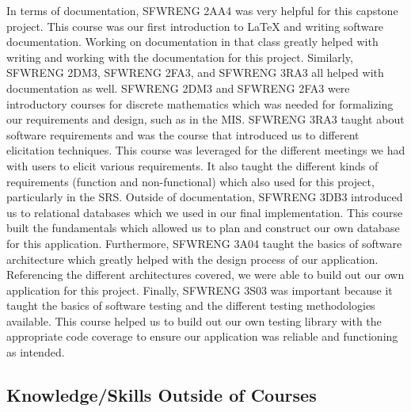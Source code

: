 \documentclass{article}
\begin{document}
In terms of documentation, SFWRENG 2AA4 was very helpful for this capstone project. This course was our first
introduction to \LaTeX{} and writing software documentation. Working on documentation in that class greatly helped
with writing and working with the documentation for this project. Similarly, SFWRENG 2DM3, SFWRENG 2FA3, and SFWRENG 3RA3
all helped with documentation as well. SFWRENG 2DM3 and SFWRENG 2FA3 were introductory courses for discrete mathematics
which was needed for formalizing our requirements and design, such as in the MIS. SFWRENG 3RA3 taught about software requirements and was the course
that introduced us to different elicitation techniques. This course was leveraged for the different meetings we had with users to elicit
various requirements. It also taught the different kinds of requirements (function and non-functional) which also used for this project, particularly
in the SRS. Outside of documentation, SFWRENG 3DB3 introduced us to relational databases which we used in our final
implementation. This course built the fundamentals which allowed us to plan and construct our own database for this application.
Furthermore, SFWRENG 3A04 taught the basics of software architecture which greatly helped with the design process of our
application. Referencing the different architectures covered, we were able to build out our own application for this project. Finally,
SFWRENG 3S03 was important because it taught the basics of software testing and the different testing methodologies available. This
course helped us to build out our own testing library with the appropriate code coverage to ensure our application was reliable
and functioning as intended.

\subsection{Knowledge/Skills Outside of Courses}

\end{document}

